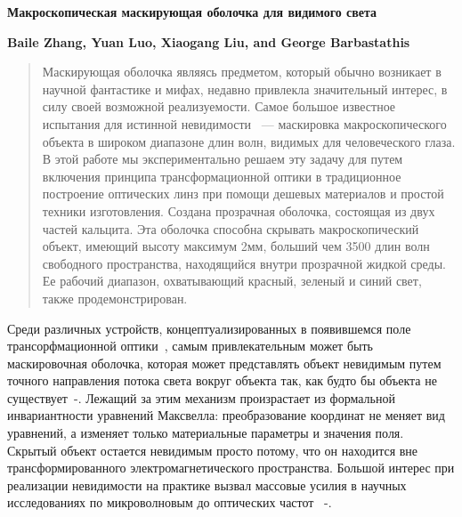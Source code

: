 \documentclass[a4paper, 12pt]{article}
\newcommand{\tit}[1]{\begin{center}{\bf{\Large #1}}\end{center}}
\newcommand{\aut}[1]{\centerline{{\bf #1}}}
\begin{document}
\sloppy
 \tit{Макроскопическая маскирующая оболочка для видимого света}
 \aut{Baile Zhang, Yuan Luo, Xiaogang Liu, and George Barbastathis}

\begin{abstract}
Маскирующая оболочка являясь предметом, который обычно возникает в научной фантастике и мифах, недавно привлекла значительный интерес, в силу
своей возможной реализуемости. Самое большое известное испытания для
истинной невидимости ~--- маскировка макроскопического объекта в широком 
диапазоне длин волн, видимых для человеческого глаза. В этой работе
мы экспериментально решаем эту задачу для путем включения принципа
трансформационной оптики в традиционное построение оптических линз
при помощи дешевых материалов и простой техники изготовления.
Создана прозрачная оболочка, состоящая из двух частей кальцита.
Эта оболочка способна скрывать макроскопический объект, имеющий высоту
максимум 2мм, больший чем 3500 длин волн свободного пространства,
находящийся внутри прозрачной жидкой среды. Ее рабочий диапазон,
охватывающий красный, зеленый и синий свет, также продемонстрирован.
\end{abstract}

Среди различных устройств, концептуализированных в появившемся поле
трансорфмационной оптики~\cite{huanyang_review}, 
самым привлекательным может быть маскировочная
оболочка, которая может представлять объект невидимым путем точного
направления потока света вокруг объекта так, как будто бы объекта не
существует~\cite{leonhardt}-\cite{li_carpet}. 
Лежащий за этим механизм произрастает из формальной 
инвариантности уравнений Максвелла: преобразование координат не меняет вид 
уравнений, а изменяет только материальные параметры и значения поля.
Скрытый объект остается невидимым просто потому, что он находится вне
трансформированного электромагнетического пространства. Большой интерес
при реализации невидимости на практике вызвал массовые усилия в научных
исследованиях по микроволновым до оптических частот 
~\cite{schurig}-\cite{ergin}. 
\end{document}

